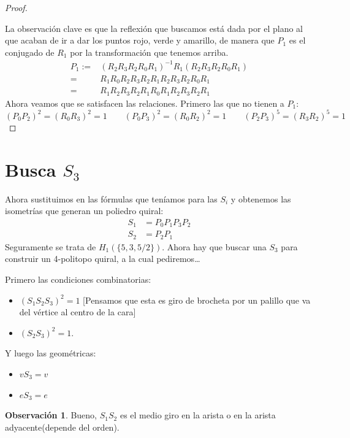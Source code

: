 \documentclass[spanish]{article}
\theoremstyle{definition}
\newtheorem*{obs}{Observación}
\begin{document}
\begin{proof}
\begin{figure}[H]
\begin{subfigure}{0.4\linewidth}
		\end{subfigure}
	\end{figure}
	La observación clave es que la reflexión que buscamos está dada por el plano al que acaban de ir a dar los puntos rojo, verde y amarillo, de manera que $P_1$ es el conjugado de $R_1$ por la transformación que tenemos arriba.
	\begin{align*}
		P_1:=&(R_2R_3R_2R_0R_1)^{-1}R_1(R_2R_3R_2R_0R_1)\\
		=&R_1R_0R_2R_3R_2R_1R_2R_3R_2R_0R_1\\
		=&R_1R_2R_3R_2R_1R_0R_1R_2R_3R_2R_1
	\end{align*}
	Ahora veamos que se satisfacen las relaciones. Primero las que no tienen a $P_1$:
	\[(P_0P_2)^2=(R_0R_3)^2=1\qquad (P_0P_3)^2=(R_0R_2)^2=1\qquad (P_2P_3)^5=(R_3R_2)^5=1\]
\end{proof}

\section{Busca $S_3$}
Ahora sustituimos en las fórmulas que teníamos para las $S_i$ y obtenemos las isometrías que generan un poliedro quiral:
\begin{align*}
	S_1&=P_0P_1P_3P_2\\
	S_2&=P_2P_1
\end{align*}
Seguramente se trata de $H_1(\{5,3,5/2\})$. Ahora hay que buscar una $S_3$ para construir un 4-politopo quiral, a la cual pediremos…

Primero las condiciones combinatorias:
\begin{itemize}
	\item $(S_1S_2S_3)^2=1$ [Pensamos que esta es giro de brocheta por un palillo que va del vértice al centro de la cara]
	\item $(S_2S_3)^2=1$.
\end{itemize}
Y luego las geométricas:
\begin{itemize}
	\item $vS_3=v$
	\item $eS_3=e$
\end{itemize}


\begin{obs}
	Bueno, $S_1S_2$ es el medio giro en la arista o en la arista adyacente(depende del orden).
\end{obs}
	
\end{document}
